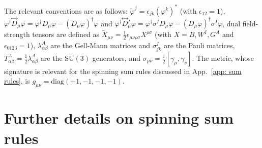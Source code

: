 \documentclass[
aps,
prd,
10pt,
twocolumn,
oneside,
preprintnumbers,
superscriptaddress,
amsmath,
amssymb,
nofootinbib,
flushbottom]{revtex4-2}
\begin{document}
The relevant conventions are as follows: $\widetilde \varphi^j = \epsilon_{jk} (\varphi^k)^*$ (with $\epsilon_{12}=1$), $\varphi^\dagger \overset{\leftrightarrow}{D}{}_\mu \varphi = \varphi^\dagger D_\mu \varphi - (D_\mu \varphi)^\dagger \varphi$ and $\varphi^\dagger \overset{\leftrightarrow}{D}{}_\mu^I \varphi = \varphi^\dagger \sigma^I D_\mu \varphi - (D_\mu \varphi)^\dagger \sigma^I \varphi$, dual field-strength tensors are defined as $\widetilde X_{\mu\nu} = \frac{1}{2}\epsilon_{\mu\nu\rho\sigma}X^{\rho\sigma}$ (with $X=B,W^I,G^A$ and $\epsilon_{0123} = 1$), $\lambda^A_{\alpha\beta}$ are the Gell-Mann matrices and $\sigma^I_{jk}$ are the Pauli matrices, $T_{\alpha\beta}^A = \frac{1}{2}\lambda^A_{\alpha\beta}$ are the $\mathrm{SU}(3)$ generators, and $\sigma_{\mu\nu} = \frac{i}{2}[\gamma_\mu,\gamma_\nu]$.
The metric, whose signature is relevant for the spinning sum rules discussed in App.~\ref{app: sum rules}, is $g_{\mu\nu} = \mathrm{diag}(+1,-1,-1,-1)$.

\section{Further details on spinning sum rules\label{app: sum rules}}
\end{document}
